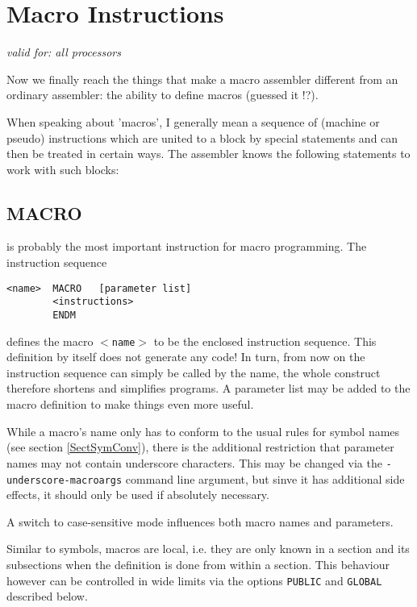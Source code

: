 \documentclass[12pt,twoside]{report}
\makeatletter
\newcommand{\tty}[1]{{\tt #1}}
\newcommand{\ttindex}[1]{\index{#1@{\tt #1}}}
\makeatother
\begin{document}
\section{Macro Instructions}

{\em valid for: all processors}

Now we finally reach the things that make a macro assembler different
from an ordinary assembler: the ability to define macros (guessed
it !?).

When speaking about 'macros', I generally mean a sequence of (machine
or pseudo) instructions which are united to a block by special
statements and can then be treated in certain ways.  The assembler
knows the following statements to work with such blocks:


\subsection{MACRO}
\ttindex{MACRO}\ttindex{ENDM}
\label{SectMacros}

is probably the most important instruction for macro programming.
The instruction sequence
\begin{verbatim}
<name>  MACRO   [parameter list]
        <instructions>
        ENDM
\end{verbatim}
defines the macro \tty{$<$name$>$} to be the enclosed instruction sequence.
This definition by itself does not generate any code!  In turn, from
now on the instruction sequence can simply be called by the name, the
whole construct therefore shortens and simplifies programs.  A
parameter list may be added to the macro definition to make things
even more useful.
\par
While a macro's name only has to conform to the usual rules for symbol
names (see section \ref{SectSymConv}), there is the additional restriction
that parameter names may not contain underscore characters.  This may
be changed via the \tty{-underscore-macroargs} command line argument,
but sinve it has additional side effects, it should only be used if
absolutely necessary.
\par
A switch to case-sensitive mode influences both macro names and
parameters.

Similar to symbols, macros are local, i.e. they are only known in a
section and its subsections when the definition is done from within
a section.  This behaviour however can be controlled in wide limits
via the options \tty{PUBLIC} and \tty{GLOBAL} described below.
\end{document}
